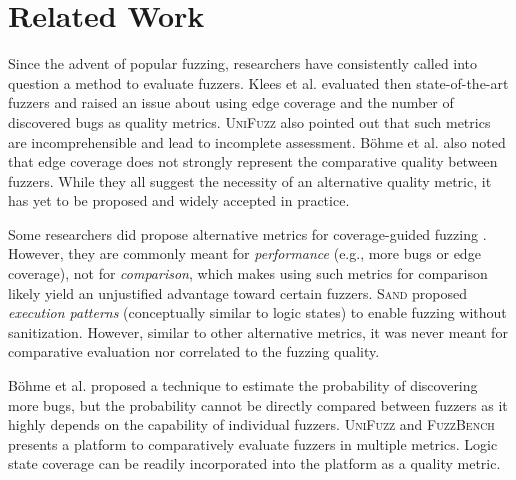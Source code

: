 \documentclass[letterpaper,twocolumn,10pt]{article}
\begin{document}
\section{Related Work}

%
Since the advent of popular fuzzing, researchers have consistently
called into question a method to evaluate fuzzers. Klees et al.
\cite{klees2018evaluating} evaluated then state-of-the-art fuzzers and raised an
issue about using edge coverage and the number of discovered bugs as quality
metrics. \textsc{UniFuzz} \cite{li2021unifuzz} also pointed out that such
metrics are incomprehensible and lead to incomplete assessment. B\"{o}hme et al.
\cite{bohme2022reliability} also noted that edge coverage does not strongly
represent the comparative quality between fuzzers.  While they all suggest the
necessity of an alternative quality metric, it has yet to be proposed and widely
accepted in practice. 

%
Some researchers did propose alternative metrics for coverage-guided fuzzing
\cite{wang2020notallcov,wang2019impactcov,yan2020pathafl,gan2020greyone,gan2018collafl}.
However, they are commonly meant for \emph{performance} (e.g., more bugs or edge
coverage), not for \emph{comparison}, which makes using such metrics for
comparison likely yield an unjustified advantage toward certain fuzzers.
%
\textsc{Sand} \cite{kong2024sand} proposed \emph{execution patterns}
(conceptually similar to logic states) to enable fuzzing without sanitization.
However, similar to other alternative metrics, it was never meant for
comparative evaluation nor correlated to the fuzzing quality. 

%
B\"{o}hme et al. \cite{bohme2021residual} proposed a technique to estimate the
probability of discovering more bugs,
but the probability cannot be directly compared between fuzzers as it highly
depends on the capability of individual fuzzers.
%
\textsc{UniFuzz} \cite{li2021unifuzz} and \textsc{FuzzBench}
\cite{metzman2021fuzzbench} presents a platform to comparatively evaluate
fuzzers in multiple metrics. 
%
Logic state coverage can be readily incorporated into the platform as a quality
metric.
\end{document}
